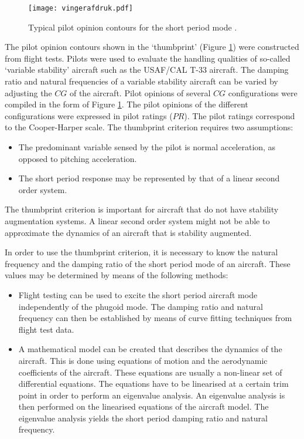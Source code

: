 \documentclass{report}
\begin{document}
\begin{figure}[htb]
	\begin{center}
		\texttt{[image: vingerafdruk.pdf]}
	\end{center}

	\caption{Typical pilot opinion contours for the short period mode \citep{OHara}.}
	\label{fig: shortperiodopinion}
\end{figure}


The pilot opinion contours shown in the `thumbprint' (Figure \ref{fig: shortperiodopinion}) were constructed from flight tests.  Pilots were used to evaluate the handling qualities of so-called `variable stability' aircraft such as the USAF/CAL \mbox{T-33}  aircraft.  The damping ratio and natural frequencies of a variable stability aircraft can be varied by adjusting the $CG$ of the aircraft.  Pilot opinions of several $CG$ configurations were compiled in the form of Figure \ref{fig: shortperiodopinion}.  The pilot opinions of the different configurations were expressed in pilot ratings ($PR$).   The pilot ratings correspond to the Cooper-Harper scale.  The thumbprint criterion requires two assumptions:

\begin{itemize}
	\item{The predominant variable sensed by the pilot is normal acceleration, as opposed to pitching acceleration.}
	\item{The short period response may be represented by that of a linear second order system.}
\end{itemize}

The thumbprint criterion is important for aircraft that do not have stability augmentation systems.  A linear second order system might not be able to approximate the dynamics of an aircraft that is stability augmented.

In order to use the thumbprint criterion, it is necessary to know the natural frequency and the damping ratio of the short period mode of an aircraft.  These values may be determined by means of the following methods:

\begin{itemize} 
	\item{Flight testing can be used to excite the short period aircraft mode independently of the phugoid mode.  The damping ratio and natural frequency can then be established by means of curve fitting techniques from flight test data.}
	\item{A mathematical model can be created that describes the dynamics of the aircraft.  This is done using equations of motion and the aerodynamic coefficients of the aircraft.  These equations are usually a non-linear set of differential equations.  The equations have to be linearised at a certain trim point in order to perform an eigenvalue analysis.  An eigenvalue analysis is then performed on the linearised equations of the aircraft model.  The eigenvalue analysis yields the short period damping ratio and natural frequency.}
\end{itemize}
\end{document}
